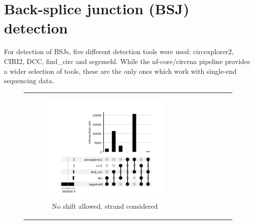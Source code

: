 \section{Back-splice junction (BSJ) detection}

For detection of BSJs, five different detection tools were used: circexplorer2,
CIRI2, DCC, find\_circ and segemehl.
While the nf-core/circrna pipeline provides a wider selection of tools, these
are the only ones which work with single-end sequencing data.

\begin{figure}[ht]
    \begin{tabular}{cc}
        \begin{subfigure}{.5\textwidth}
            \centering

            \includegraphics[width=\linewidth]{chapters/4_results_and_discussion/figures/detection/upset/diff_0_strand.png}
            \caption{No shift allowed, strand considered}
            \label{fig:detection_upset_full}
        \end{subfigure}
         &
        \begin{subfigure}{.5\textwidth}
            \centering


\end{subfigure}
\end{tabular}
\end{figure}

